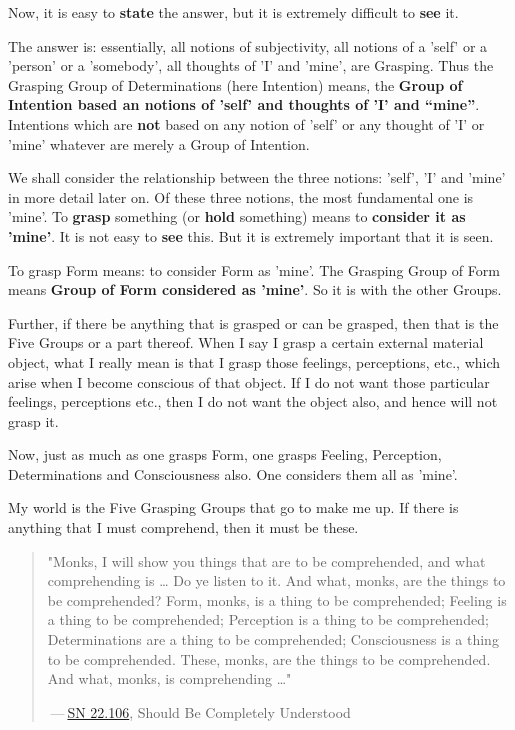 Now, it is easy to \textbf{state} the answer, but it is extremely difficult to \textbf{see} it.

The answer is: essentially, all notions of subjectivity, all notions of a 'self' or a 'person' or a 'somebody', all thoughts of 'I' and 'mine', are Grasping. Thus the Grasping Group of Determinations (here Intention) means, the \textbf{Group of Intention based an notions of 'self' and thoughts of 'I' and ``mine''}. Intentions which are \textbf{not} based on any notion of 'self' or any thought of 'I' or 'mine' whatever are merely a Group of Intention.

We shall consider the relationship between the three notions: 'self', 'I' and 'mine' in more detail later on. Of these three notions, the most fundamental one is 'mine'. To \textbf{grasp} something (or \textbf{hold} something) means to \textbf{consider it as 'mine'}. It is not easy to \textbf{see} this. But it is extremely important that it is seen.

To grasp Form means: to consider Form as 'mine'. The Grasping Group of Form means \textbf{Group of Form considered as 'mine'}. So it is with the other Groups.

Further, if there be anything that is grasped or can be grasped, then that is the Five Groups or a part thereof. When I say I grasp a certain external material object, what I really mean is that I grasp those feelings, perceptions, etc., which arise when I become conscious of that object. If I do not want those particular feelings, perceptions etc., then I do not want the object also, and hence will not grasp it.

Now, just as much as one grasps Form, one grasps Feeling, Perception, Determinations and Consciousness also. One considers them all as 'mine'.

My world is the Five Grasping Groups that go to make me up. If there is anything that I must comprehend, then it must be these.

\begin{quote}
"Monks, I will show you things that are to be comprehended, and what comprehending is \ldots\hspace{0pt} Do ye listen to it. And what, monks, are the things to be comprehended? Form, monks, is a thing to be comprehended; Feeling is a thing to be comprehended; Perception is a thing to be comprehended; Determinations are a thing to be comprehended; Consciousness is a thing to be comprehended. These, monks, are the things to be comprehended. And what, monks, is comprehending \ldots\hspace{0pt}"

 --- \href{https://suttacentral.net/sn22.106/en/sujato}{SN 22.106}, Should Be Completely Understood
\end{quote}

